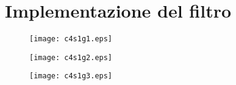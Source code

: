 

\chapter{Implementazione del filtro}
\label{cap:implementazione}

\graphicspath{{Graph/}}


\begin{figure}[tbp] 
\centering    
\texttt{[image: c4s1g1.eps]}
\caption[]
{ }
\label{fig:c4s0}
\end{figure}


\begin{figure}[tbp] 
\centering    
\texttt{[image: c4s1g2.eps]}
\caption[]
{ }
\label{fig:c4s0}
\end{figure}


\begin{figure}[tbp] 
\centering    
\texttt{[image: c4s1g3.eps]}
\caption[]
{ }
\label{fig:c4s0}
\end{figure}
